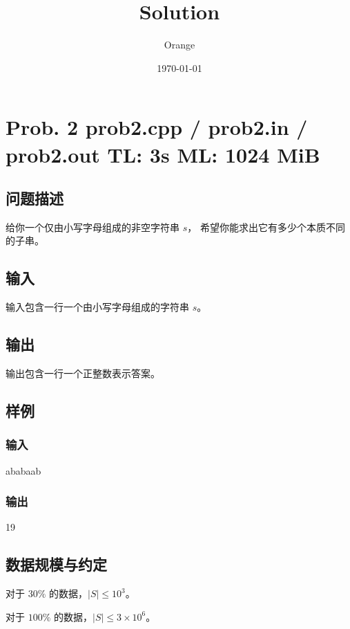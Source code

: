 \documentclass[UTF8]{article}
\title{Solution}
\author{Orange}
\date{\today}
\begin{document}
	\heiti

	\section{Prob. 2 \small {prob2.cpp / prob2.in / prob2.out} TL: 3s ML: 1024 MiB}

	\subsection{问题描述}

	给你一个仅由小写字母组成的非空字符串 $s$，
	希望你能求出它有多少个本质不同的子串。

	\subsection{输入}

	输入包含一行一个由小写字母组成的字符串 $s$。

	\subsection{输出}

	输出包含一行一个正整数表示答案。

	\subsection{样例}

	\subsubsection{输入}

	ababaab

	\subsubsection{输出}

	19

	\subsection{数据规模与约定}

	对于 $30\%$ 的数据，$|S| \le 10^3$。

	对于 $100\%$ 的数据，$|S| \le 3 \times 10^6$。
\end{document}
